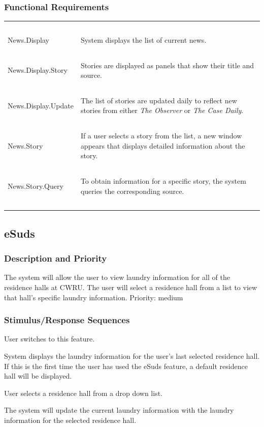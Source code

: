 \documentclass[pdftex,12pt,letter]{article}
\begin{document}
\subsubsection{Functional Requirements}
\begin{table}[!h]
\begin{tabularx}{\textwidth}[t]{|l Y|}
\hline
~&~\\
News.Display & System displays the list of current news.\\
~&~\\
News.Display.Story & Stories are displayed as panels that show their title and source.\\
~&~\\
News.Display.Update & The list of stories are updated daily to reflect new stories from either \emph{The Observer} or \emph{The Case Daily}.\\
~&~\\
News.Story & If a user selects a story from the list, a new window appears that displays detailed information about the story.\\
~&~\\
News.Story.Query & To obtain information for a specific story, the system queries the corresponding source.\\
~&~\\
\hline
\end{tabularx}
\end{table}
\FloatBarrier
\subsection{eSuds}
\subsubsection{Description and Priority}
The system will allow the user to view laundry information for all of the residence halls at CWRU. The user will select a residence hall from a list to view that hall's specific laundry information. Priority: medium
\subsubsection{Stimulus/Response Sequences}
\begin{description}\itemsep1pt
\item[Stimulus:] User switches to this feature.
\item[Response:] System displays the laundry information for the user's last selected residence hall. If this is the first time the user has used the eSuds feature, a default residence hall will be displayed.
\item[Stimulus:] User selects a residence hall from a drop down list.
\item[Response:] The system will update the current laundry information with the laundry information for the selected residence hall.
\end{description}
\end{document}
